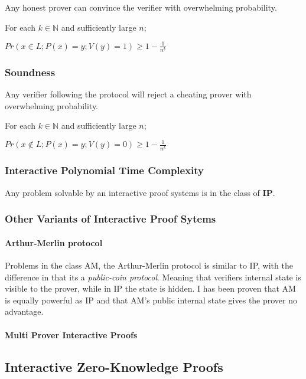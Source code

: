 Any honest prover can convince the verifier with overwhelming probability.

\bigskip

For each $k \in \mathbb{N}$ and sufficiently large $n$;

\bigskip
$Pr(x \in L; P(x) = y; V(y) = 1) \ge 1 - \frac{1}{n^k}$

\subsubsection{Soundness}

Any verifier following the protocol will reject a cheating prover with overwhelming probability.

\bigskip

For each $k \in \mathbb{N}$ and sufficiently large $n$;

\bigskip

$Pr(x \notin L; P(x) = y; V(y) = 0) \ge 1 - \frac{1}{n^k}$

\subsubsection{ Interactive Polynomial Time Complexity}
Any problem solvable by an interactive proof systems is in the class of \textbf{IP}.

\subsubsection{Other Variants of Interactive Proof Sytems}
\paragraph{Arthur-Merlin protocol} Problems in the class AM, the Arthur-Merlin protocol is similar to IP, with the difference in that its a \textit{public-coin protocol}. Meaning that verifiers internal state is visible to the prover, while in IP the state is hidden.
I has been proven that AM is equally powerful as IP and that AM's public internal state gives the prover no advantage.

\paragraph{Multi Prover Interactive Proofs}


\subsection{Interactive Zero-Knowledge Proofs}

